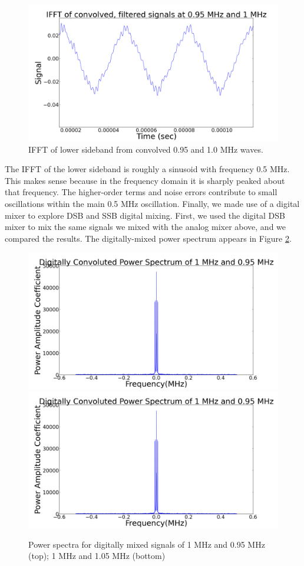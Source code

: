 \documentclass[11pt]{article}
\begin{document}
\begin{figure}
\centering
\includegraphics[scale=0.35]{pictures/ifft}
\caption{IFFT of lower sideband from convolved 0.95 and 1.0 MHz waves. \label{ifft}}
\end{figure}

The IFFT of the lower sideband is roughly a sinusoid with frequency 0.5 MHz. This makes sense because in the frequency domain it is sharply peaked about that frequency. The higher-order terms and noise errors contribute to small oscillations within the main 0.5 MHz oscillation. Finally, we made use of a digital mixer to explore DSB and SSB digital mixing. First, we used the digital DSB mixer to mix the same signals we mixed with the analog mixer above, and we compared the results. The digitally-mixed power spectrum appears in Figure \ref{digpow}.

\begin{figure}
\centering
\includegraphics[scale=0.35]{pictures/digitaloninefive}
\includegraphics[scale=0.35]{pictures/digitaloninefive}
\caption{Power spectra for digitally mixed signals of 1 MHz and 0.95 MHz (top); 1 MHz and 1.05 MHz (bottom) \label{digpow}}
\end{figure}
\end{document}

